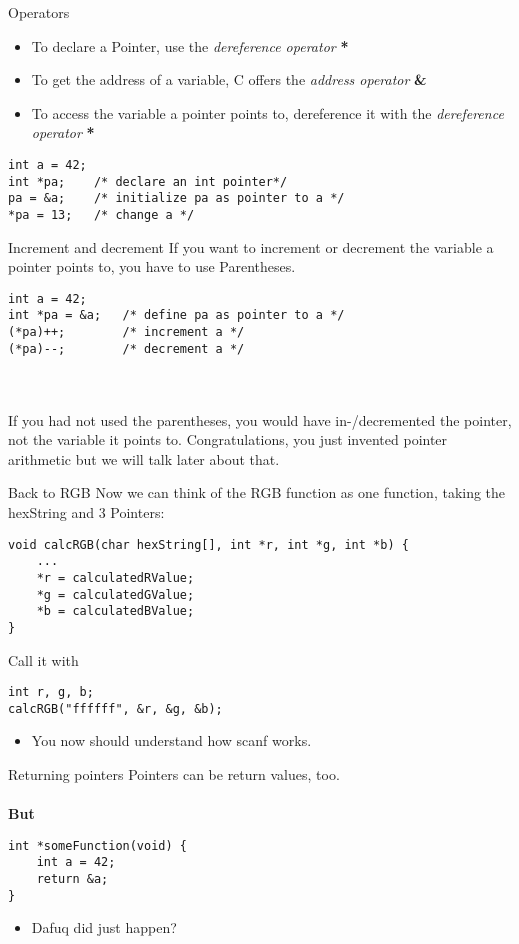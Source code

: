 \begin{frame}[fragile]{Operators}
	\begin{itemize}
		\item To declare a Pointer, use the \textit{dereference operator} \textbf{*}
		\item To get the address of a variable, C offers the \textit{address operator} \textbf{\&}
		\item To access the variable a pointer points to, dereference it with the \textit{dereference operator} \textbf{*}
	\end{itemize}
	\begin{lstlisting}[numbers=none]
int a = 42;
int *pa;	/* declare an int pointer*/
pa = &a;	/* initialize pa as pointer to a */
*pa = 13;	/* change a */
\end{lstlisting}
\end{frame}
\begin{frame}[fragile]{Increment and decrement}
	If you want to increment or decrement the variable a pointer points to, you have to use Parentheses.
	\begin{lstlisting}[numbers=none]
int a = 42;
int *pa = &a;	/* define pa as pointer to a */
(*pa)++;		/* increment a */
(*pa)--;		/* decrement a */
\end{lstlisting}
\ \\\ \\
If you had not used the parentheses, you would have in-/decremented the pointer, not the variable it points to. Congratulations, you just invented pointer arithmetic but we will talk later about that.
\end{frame}
\begin{frame}[fragile]{Back to RGB}
	Now we can think of the RGB function as one function, taking the hexString and 3 Pointers:
	\begin{lstlisting}[numbers=none]
void calcRGB(char hexString[], int *r, int *g, int *b) {
	...
	*r = calculatedRValue;
	*g = calculatedGValue;
	*b = calculatedBValue;
}
\end{lstlisting}
	Call it with
	\begin{lstlisting}[numbers=none]
int r, g, b;
calcRGB("ffffff", &r, &g, &b);
\end{lstlisting}
	\begin{itemize}
		\item You now should understand how scanf works.
	\end{itemize}
\end{frame}
\begin{frame}[fragile]{Returning pointers}
Pointers can be return values, too.\\\ \\
\textbf{But} 
	\begin{lstlisting}[numbers=none]
int *someFunction(void) {	
	int a = 42;
	return &a;
}
\end{lstlisting}
	\begin{itemize}
		\item Dafuq did just happen?
	\end{itemize}
\end{frame}

